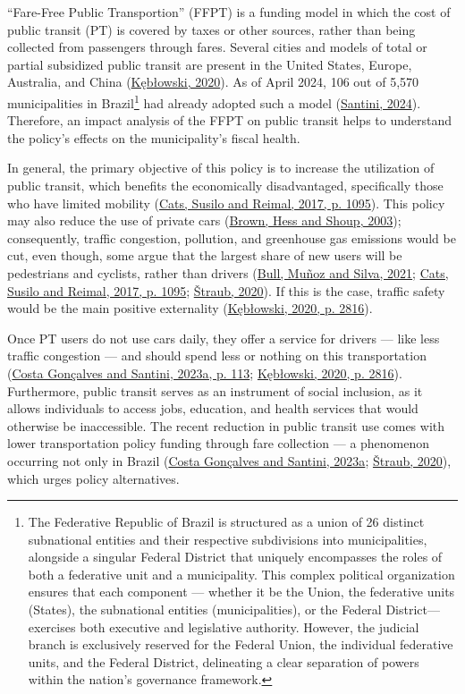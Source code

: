 \documentclass[12pt, a4paper, twoside]{article}
\numberwithin{equation}{subsection} %
\begin{document}
``Fare-Free Public Transportion'' (FFPT) is a funding model in which the
cost of public transit (PT) is covered by taxes or other sources, rather
than being collected from passengers through fares. Several cities and
models of total or partial subsidized public transit are present in the
United States, Europe, Australia, and China
(\protect\hyperlink{ref-keblowski_why_2020}{Kębłowski, 2020}). As of
April 2024, 106 out of 5,570 municipalities in Brazil\footnote{The
  Federative Republic of Brazil is structured as a union of 26 distinct
  subnational entities and their respective subdivisions into
  municipalities, alongside a singular Federal District that uniquely
  encompasses the roles of both a federative unit and a municipality.
  This complex political organization ensures that each component ---
  whether it be the Union, the federative units (States), the
  subnational entities (municipalities), or the Federal
  District---exercises both executive and legislative authority.
  However, the judicial branch is exclusively reserved for the Federal
  Union, the individual federative units, and the Federal District,
  delineating a clear separation of powers within the nation's
  governance framework.} had already adopted such a model
(\protect\hyperlink{ref-Santini-FFPT-2024}{Santini, 2024}). Therefore,
an impact analysis of the FFPT on public transit helps to understand the
policy's effects on the municipality's fiscal health.

In general, the primary objective of this policy is to increase the
utilization of public transit, which benefits the economically
disadvantaged, specifically those who have limited mobility
(\protect\hyperlink{ref-cats_prospects_2017}{Cats, Susilo and Reimal,
2017, p. 1095}). This policy may also reduce the use of private cars
(\protect\hyperlink{ref-Brown_2003}{Brown, Hess and Shoup, 2003});
consequently, traffic congestion, pollution, and greenhouse gas
emissions would be cut, even though, some argue that the largest share
of new users will be pedestrians and cyclists, rather than drivers
(\protect\hyperlink{ref-BULL-RCT-2021}{Bull, Muñoz and Silva, 2021};
\protect\hyperlink{ref-cats_prospects_2017}{Cats, Susilo and Reimal,
2017, p. 1095}; \protect\hyperlink{ref-straub_2020}{Štraub, 2020}). If
this is the case, traffic safety would be the main positive externality
(\protect\hyperlink{ref-keblowski_why_2020}{Kębłowski, 2020, p. 2816}).

Once PT users do not use cars daily, they offer a service for drivers
--- like less traffic congestion --- and should spend less or nothing on
this transportation
(\protect\hyperlink{ref-Costa_Gonuxe7alves_Santini_2023}{Costa Gonçalves
and Santini, 2023a, p. 113};
\protect\hyperlink{ref-keblowski_why_2020}{Kębłowski, 2020, p. 2816}).
Furthermore, public transit serves as an instrument of social inclusion,
as it allows individuals to access jobs, education, and health services
that would otherwise be inaccessible. The recent reduction in public
transit use comes with lower transportation policy funding through fare
collection --- a phenomenon occurring not only in Brazil
(\protect\hyperlink{ref-Costa_Gonuxe7alves_Santini_2023}{Costa Gonçalves
and Santini, 2023a}; \protect\hyperlink{ref-straub_2020}{Štraub, 2020}),
which urges policy alternatives.
\end{document}
